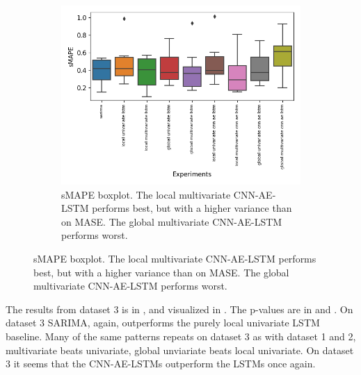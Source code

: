 \begin{samepage}
\begin{figure}[h!]
\begin{subfigure}[t]{0.49\textwidth}
    \end{subfigure}
    \begin{subfigure}[t]{0.49\textwidth}
      \includegraphics[width=\textwidth]{./figs/results/boxplot/smape-dataset_3.png}
      \hfill
      \caption{sMAPE boxplot. The local multivariate CNN-AE-LSTM performs best,
        but with a higher variance than on MASE.
        The global multivariate CNN-AE-LSTM performs worst.}
      \label{fig:results:boxplot-smape-dataset-3}
    \end{subfigure}
    \label{fig:results:boxplot-dataset-3}
  \end{figure}
\end{samepage}
The results from dataset 3 is in ,
and visualized in .
The p-values are in  and
.
On dataset 3 SARIMA, again, outperforms the purely local univariate LSTM baseline.
Many of the same patterns repeats on dataset 3 as with dataset 1 and 2, multivariate beats univariate,
global unviariate beats local univariate.
On dataset 3 it seems that the CNN-AE-LSTMs outperform the LSTMs once again.

